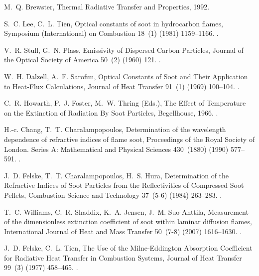 \documentclass[preprint,12pt]{elsarticle}
\begin{document}
\begin{thebibliography}{10}
M.~Q. Brewster, {Thermal Radiative Transfer and Properties}, 1992.

S.~C. Lee, C.~L. Tien, {Optical constants of soot in hydrocarbon flames},
{Symposium (International) on Combustion} 18~(1) (1981) 1159--1166.
\newblock \href {http://dx.doi.org/10.1016/S0082-0784(81)80120-8}
  {}.

V.~R. Stull, G.~N. Plass, {Emissivity of Dispersed Carbon Particles}, {Journal
of the Optical Society of America} 50~(2) (1960) 121.
\newblock \href {http://dx.doi.org/10.1364/JOSA.50.000121}
  {}.

W.~H. Dalzell, A.~F. Sarofim, {Optical Constants of Soot and Their Application
to Heat-Flux Calculations}, {Journal of Heat Transfer} 91~(1) (1969)
100--104.
\newblock \href {http://dx.doi.org/10.1115/1.3580063}
  {}.

C.~R. Howarth, P.~J. Foster, M.~W. Thring (Eds.), {The Effect of Temperature on
the Extinction of Radiation By Soot Particles}, Begellhouse, 1966.
\newblock \href {http://dx.doi.org/10.1615/IHTC3.1210}
  {}.

H.-c. Chang, T.~T. Charalampopoulos, {Determination of the wavelength
dependence of refractive indices of flame soot}, {Proceedings of the Royal
Society of London. Series A: Mathematical and Physical Sciences} 430~(1880)
(1990) 577--591.
\newblock \href {http://dx.doi.org/10.1098/rspa.1990.0107}
  {}.

J.~D. Felske, T.~T. Charalampopoulos, H.~S. Hura, {Determination of the
Refractive Indices of Soot Particles from the Reflectivities of Compressed
Soot Pellets}, {Combustion Science and Technology} 37~(5-6) (1984) 263--283.
\newblock \href {http://dx.doi.org/10.1080/00102208408923757}
  {}.

T.~C. Williams, C.~R. Shaddix, K.~A. Jensen, J.~M. Suo-Anttila, {Measurement of
the dimensionless extinction coefficient of soot within laminar diffusion
flames}, {International Journal of Heat and Mass Transfer} 50~(7-8) (2007)
1616--1630.
\newblock \href {http://dx.doi.org/10.1016/j.ijheatmasstransfer.2006.08.024}
  {}.

J.~D. Felske, C.~L. Tien, {The Use of the Milne-Eddington Absorption
Coefficient for Radiative Heat Transfer in Combustion Systems}, {Journal of
Heat Transfer} 99~(3) (1977) 458--465.
\newblock \href {http://dx.doi.org/10.1115/1.3450718}
  {}.


\end{thebibliography}
\end{document}
